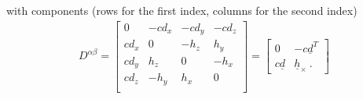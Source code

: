 \documentclass[letterpaper,10pt,english]{jupyterBook}
\begin{document}
\sphinxAtStartPar
with components (rows for the first index, columns for the second index)
\begin{equation*}
\begin{split}D^{\alpha \beta} = 
  \begin{bmatrix}     0 & -c d_x & - c d_y & - c d_z \\
                  c d_x &      0 & -   h_z &     h_y \\
                  c d_y &    h_z &       0 & -   h_x \\
                  c d_z & -  h_y &     h_x &       0 \\
  \end{bmatrix} =
  \begin{bmatrix} 0 & - c \underline{d}^T \\ c \underline{d} & \underline{h}_{\times} \ .
  \end{bmatrix}
\end{split}
\end{equation*}
\end{document}
